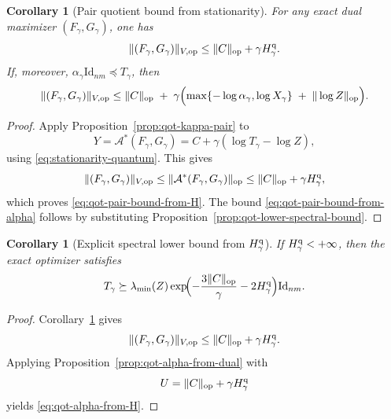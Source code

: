 \documentclass[11pt]{article}
\newcommand{\Id}{\mathrm{Id}}
\newcommand{\Aa}{\mathcal{A}}
\newcommand{\op}{\mathrm{op}}
\theoremstyle{plain}
\newtheorem{corollary}[proposition]{Corollary}
\begin{document}
\begin{corollary}[Pair quotient bound from stationarity]
\label{cor:qot-pair-bound-from-H}
For any exact dual maximizer $(F_\gamma,G_\gamma)$, one has
\begin{equation}
\label{eq:qot-pair-bound-from-H}
\|(F_\gamma,G_\gamma)\|_{V,\op}
\le
\|C\|_{\op}+\gamma H_\gamma^{\rm q}.
\end{equation}
If, moreover, $\alpha_\gamma \Id_{nm}\preceq T_\gamma$, then
\begin{equation}
\label{eq:qot-pair-bound-from-alpha}
\|(F_\gamma,G_\gamma)\|_{V,\op}
\le
\|C\|_{\op}
\;+\;
\gamma\Bigl(
\max\{-\log \alpha_\gamma,\log X_\gamma\}
\;+\;
\|\log Z\|_{\op}
\Bigr).
\end{equation}
\end{corollary}

\begin{proof}
Apply Proposition~\ref{prop:qot-kappa-pair} to
\[
Y=\Aa^\ast(F_\gamma,G_\gamma)
=
C+\gamma(\log T_\gamma-\log Z),
\]
using \eqref{eq:stationarity-quantum}. This gives
\[
\|(F_\gamma,G_\gamma)\|_{V,\op}
\le
\|\Aa^\ast(F_\gamma,G_\gamma)\|_{\op}
\le
\|C\|_{\op}+\gamma H_\gamma^{\rm q},
\]
which proves \eqref{eq:qot-pair-bound-from-H}.
The bound \eqref{eq:qot-pair-bound-from-alpha} follows by substituting Proposition~\ref{prop:qot-lower-spectral-bound}.
\end{proof}

\begin{corollary}[Explicit spectral lower bound from \texorpdfstring{$H_\gamma^{\rm q}$}{H-gamma-q}]
\label{cor:qot-alpha-from-H}
If $H_\gamma^{\rm q}<+\infty$, then the exact optimizer satisfies
\begin{equation}
\label{eq:qot-alpha-from-H}
T_\gamma
\succeq
\lambda_{\min}(Z)\exp\!\Bigl(
-\frac{3\|C\|_{\op}}{\gamma}
-2H_\gamma^{\rm q}
\Bigr)\Id_{nm}.
\end{equation}
\end{corollary}

\begin{proof}
Corollary~\ref{cor:qot-pair-bound-from-H} gives
\[
\|(F_\gamma,G_\gamma)\|_{V,\op}
\le
\|C\|_{\op}+\gamma H_\gamma^{\rm q}.
\]
Applying Proposition~\ref{prop:qot-alpha-from-dual} with
\[
U=\|C\|_{\op}+\gamma H_\gamma^{\rm q}
\]
yields \eqref{eq:qot-alpha-from-H}.
\end{proof}
\end{document}
